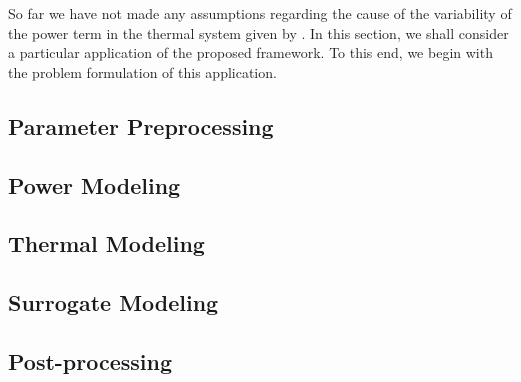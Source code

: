 So far we have not made any assumptions regarding the cause of the variability of the power term in the thermal system given by .
In this section, we shall consider a particular application of the proposed framework.
To this end, we begin with the problem formulation of this application.



\subsection{Parameter Preprocessing} 


\subsection{Power Modeling} 



\subsection{Thermal Modeling} 


\subsection{Surrogate Modeling} 


\subsection{Post-processing} 

